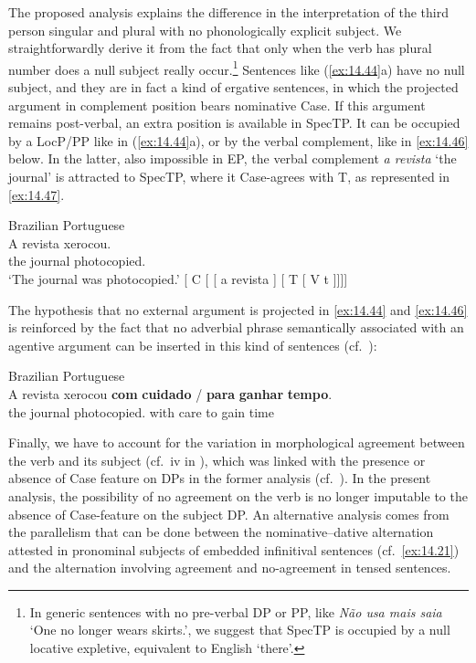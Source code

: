\documentclass[output=paper]{langsci/langscibook}
\begin{document}
The proposed analysis explains the difference in the interpretation of the
third person singular and plural with no phonologically explicit subject. We
straightforwardly derive it from the fact that only when the verb has plural
number does a null subject really occur.\footnote{In generic
    sentences with no pre-verbal DP or PP, like \emph{Não usa mais saia} ‘One
no longer wears skirts.’, we suggest that SpecTP is occupied by a null locative
expletive, equivalent to English ‘there’.} Sentences like
(\ref{ex:14.44}a) have no null subject, and they are in fact a kind of
ergative sentences, in which the projected argument in complement position
bears nominative Case. If this argument remains
post-verbal, an extra position is available in SpecTP. It can be occupied by a
LocP/PP like in (\ref{ex:14.44}a), or by the verbal complement, like in
\eqref{ex:14.46} below. In the latter, also impossible in EP, the verbal
complement \emph{a revista} ‘the journal’ is attracted to SpecTP, where it
Case-agrees with T, as represented in \eqref{ex:14.47}.

\ea\label{ex:14.46}Brazilian Portuguese\\
    \gll    A revista xerocou.\\
            the journal photocopied.\Tsg{}\\
    \glt    ‘The journal was photocopied.’
\ex\label{ex:14.47}
    {}[ C [ [ a revista ] [ T  [ V t ]]]]
\z

The hypothesis that no external argument is projected in \eqref{ex:14.44} and
\eqref{ex:14.46} is reinforced by the fact that no adverbial phrase semantically
associated with an agentive argument can be inserted in this kind of sentences
(cf.\ \citealt{Galves2000}):

\ea%
    \label{ex:14.48}Brazilian Portuguese\\
    \gll    \llap{\#}A revista xerocou \textbf{com} \textbf{cuidado} / \textbf{para} \textbf{ganhar} \textbf{tempo}.\\
            the journal photocopied.\Tsg{} with care {} to gain time\\
\z

Finally, we have to account for the variation in morphological agreement
be\-tween the verb and its subject (cf.\ iv in ), which was
linked with the presence or absence of Case feature on DPs in the former
analysis (cf.\ ). In the present analysis, the possibility
of no agreement on the verb is no longer imputable to the absence of
Case-feature on the subject DP. An alternative analysis comes from the
parallelism that can be done between the nominative--dative alternation attested
in pronominal subjects of embedded infinitival sentences (cf.\
\ref{ex:14.21}) and the alternation involving agreement and no-agreement
in tensed sentences.
\end{document}
